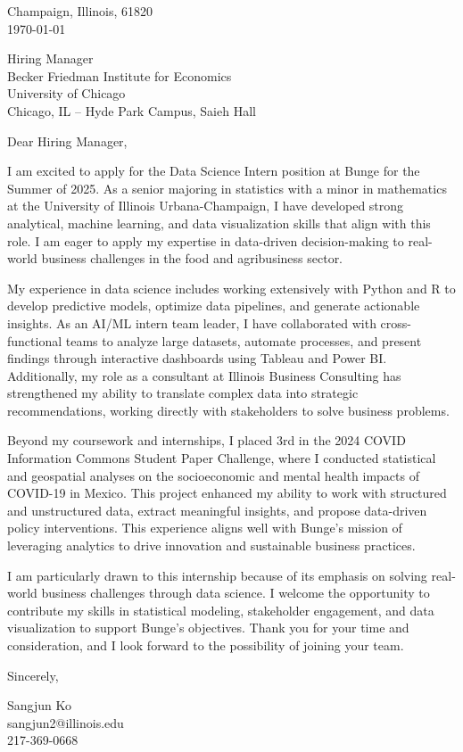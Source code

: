 \documentclass[11pt]{article}
\begin{document}
\noindent
Champaign, Illinois, 61820 \\
\today
\vspace{2em}

\noindent
Hiring Manager\\
Becker Friedman Institute for Economics\\
University of Chicago\\
Chicago, IL – Hyde Park Campus, Saieh Hall

\vspace{1.5em}

Dear Hiring Manager,

I am excited to apply for the Data Science Intern position at Bunge for the Summer of 2025. As a senior majoring in statistics with a minor in mathematics at the University of Illinois Urbana-Champaign, I have developed strong analytical, machine learning, and data visualization skills that align with this role. I am eager to apply my expertise in data-driven decision-making to real-world business challenges in the food and agribusiness sector.

My experience in data science includes working extensively with Python and R to develop predictive models, optimize data pipelines, and generate actionable insights. As an AI/ML intern team leader, I have collaborated with cross-functional teams to analyze large datasets, automate processes, and present findings through interactive dashboards using Tableau and Power BI. Additionally, my role as a consultant at Illinois Business Consulting has strengthened my ability to translate complex data into strategic recommendations, working directly with stakeholders to solve business problems.

Beyond my coursework and internships, I placed 3rd in the 2024 COVID Information Commons Student Paper Challenge, where I conducted statistical and geospatial analyses on the socioeconomic and mental health impacts of COVID-19 in Mexico. This project enhanced my ability to work with structured and unstructured data, extract meaningful insights, and propose data-driven policy interventions. This experience aligns well with Bunge’s mission of leveraging analytics to drive innovation and sustainable business practices.

I am particularly drawn to this internship because of its emphasis on solving real-world business challenges through data science. I welcome the opportunity to contribute my skills in statistical modeling, stakeholder engagement, and data visualization to support Bunge’s objectives. Thank you for your time and consideration, and I look forward to the possibility of joining your team.

\vspace{1em}

Sincerely,

\vspace{2em}

\noindent
Sangjun Ko\\
sangjun2@illinois.edu\\
217-369-0668
\end{document}
